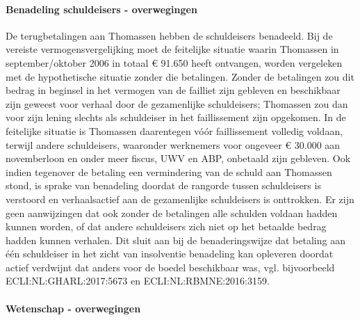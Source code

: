 \documentclass[
  dutch,
  a4paper,
]{article}
\begin{document}
\paragraph{Benadeling schuldeisers - overwegingen}\label{benadeling-schuldeisers---overwegingen-79}

De terugbetalingen aan Thomassen hebben de schuldeisers benadeeld. Bij de vereiste vermogensvergelijking moet de feitelijke situatie waarin Thomassen in september/oktober 2006 in totaal € 91.650 heeft ontvangen, worden vergeleken met de hypothetische situatie zonder die betalingen. Zonder de betalingen zou dit bedrag in beginsel in het vermogen van de failliet zijn gebleven en beschikbaar zijn geweest voor verhaal door de gezamenlijke schuldeisers; Thomassen zou dan voor zijn lening slechts als schuldeiser in het faillissement zijn opgekomen. In de feitelijke situatie is Thomassen daarentegen vóór faillissement volledig voldaan, terwijl andere schuldeisers, waaronder werknemers voor ongeveer € 30.000 aan novemberloon en onder meer fiscus, UWV en ABP, onbetaald zijn gebleven. Ook indien tegenover de betaling een vermindering van de schuld aan Thomassen stond, is sprake van benadeling doordat de rangorde tussen schuldeisers is verstoord en verhaalsactief aan de gezamenlijke schuldeisers is onttrokken. Er zijn geen aanwijzingen dat ook zonder de betalingen alle schulden voldaan hadden kunnen worden, of dat andere schuldeisers zich niet op het betaalde bedrag hadden kunnen verhalen. Dit sluit aan bij de benaderingswijze dat betaling aan één schuldeiser in het zicht van insolventie benadeling kan opleveren doordat actief verdwijnt dat anders voor de boedel beschikbaar was, vgl. bijvoorbeeld ECLI:NL:GHARL:2017:5673 en ECLI:NL:RBMNE:2016:3159.

\paragraph{Wetenschap - overwegingen}\label{wetenschap---overwegingen-79}
\end{document}
